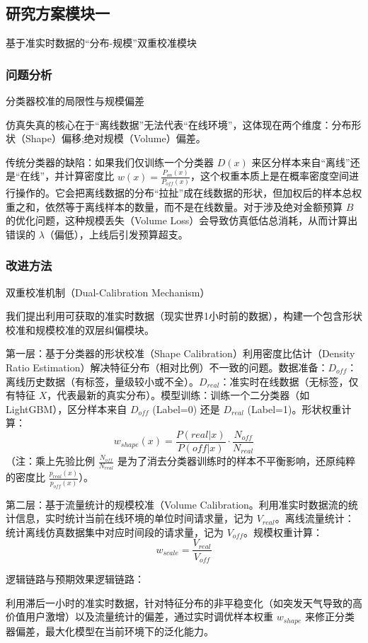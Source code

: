 \documentclass[12pt, a4paper]{article}
\begin{document}
\subsection{研究方案模块一}基于准实时数据的“分布-规模”双重校准模块
\subsubsection{问题分析}分类器校准的局限性与规模偏差

仿真失真的核心在于“离线数据”无法代表“在线环境”，这体现在两个维度：分布形状（Shape）偏移;绝对规模（Volume）偏差。

传统分类器的缺陷：如果我们仅训练一个分类器 $D(x)$ 来区分样本来自“离线”还是“在线”，并计算密度比 $w(x) = \frac{P_{on}(x)}{P_{off}(x)}$，这个权重本质上是在概率密度空间进行操作的。它会把离线数据的分布“拉扯”成在线数据的形状，但加权后的样本总权重之和，依然等于离线样本的数量，而不是在线数量。对于涉及绝对金额预算 $B$ 的优化问题，这种规模丢失（Volume Loss）会导致仿真低估总消耗，从而计算出错误的 $\lambda$（偏低），上线后引发预算超支。

\subsubsection{改进方法}双重校准机制（Dual-Calibration Mechanism）

我们提出利用可获取的准实时数据（现实世界1小时前的数据），构建一个包含形状校准和规模校准的双层纠偏模块。

第一层：基于分类器的形状校准（Shape Calibration）利用密度比估计（Density Ratio Estimation）解决特征分布（相对比例）不一致的问题。数据准备：$D_{off}$：离线历史数据（有标签，量级较小或不全）。$D_{real}$：准实时在线数据（无标签，仅有特征 $X$，代表最新的真实分布）。模型训练：训练一个二分类器（如LightGBM），区分样本来自 $D_{off}$ (Label=0) 还是 $D_{real}$ (Label=1)。形状权重计算：$$w_{shape}(x) = \frac{P(real|x)}{P(off|x)} \cdot \frac{N_{off}}{N_{real}}$$（注：乘上先验比例 $\frac{N_{off}}{N_{real}}$ 是为了消去分类器训练时的样本不平衡影响，还原纯粹的密度比 $\frac{p_{real}(x)}{p_{off}(x)}$）。

第二层：基于流量统计的规模校准（Volume Calibration。利用准实时数据流的统计信息，实时统计当前在线环境的单位时间请求量，记为 $V_{real}$。离线流量统计：统计离线仿真数据集中对应时间段的请求量，记为 $V_{off}$。规模权重计算：$$w_{scale} = \frac{V_{real}}{V_{off}}$$

逻辑链路与预期效果逻辑链路：

利用滞后一小时的准实时数据，针对特征分布的非平稳变化（如突发天气导致的高价值用户激增）以及流量统计的偏差，通过实时调优样本权重 $w_{shape}$ 来修正分类器偏差，最大化模型在当前环境下的泛化能力。
\end{document}
